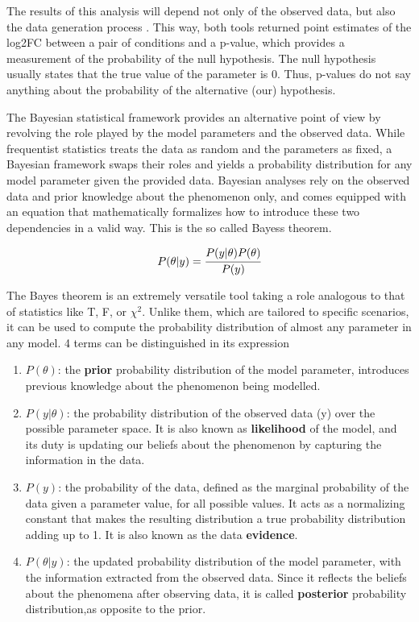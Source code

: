 The results of this analysis will depend not only of the observed data, but also the data generation process \cite{Kruschke}. This way, both tools returned point estimates of the log2FC between a pair of conditions and a p-value, which provides a measurement of the probability of the null hypothesis. The null hypothesis usually states that the true value of the parameter is 0. Thus, p-values do not say anything about the probability of the alternative (our) hypothesis.

The Bayesian statistical framework provides an alternative point of view by revolving the role played by the model parameters and the observed data. While frequentist statistics treats the data as random and the parameters as fixed, a Bayesian framework swaps their roles and yields a probability distribution for any model parameter given the provided data. Bayesian analyses rely on the observed data and prior knowledge about the phenomenon only, and comes equipped with an equation that mathematically formalizes how to introduce these two dependencies in a valid way. This is the so called Bayes\textquotesingle s theorem.

\begin{equation}
P(\theta | y) = \cfrac{P(y | \theta) P(\theta)}{P(y)}
\end{equation}

The Bayes theorem is an extremely versatile tool taking a role analogous to that of statistics like T, F, or $\chi^2$. Unlike them, which are tailored to specific scenarios, it can be used to compute the probability distribution of almost any parameter in any model. 4 terms can be distinguished in its expression

\begin{enumerate}

\item $P(\theta)$: the \textbf{prior} probability distribution of the model parameter, introduces previous knowledge about the phenomenon being modelled.

\item $P(y | \theta)$: the probability distribution of the observed data (y) over the possible parameter space. It is also known as \textbf{likelihood} of the model, and its duty is updating our beliefs about the phenomenon by capturing the information in the data.

\item $P(y)$: the probability of the data, defined as the marginal probability of the data given a parameter value, for all possible values. It acts as a normalizing constant that makes the resulting distribution a true probability distribution adding up to 1. It is also known as the data \textbf{evidence}.

\item $P(\theta | y)$: the updated probability distribution of the model parameter, with the information extracted from the observed data. Since it reflects the beliefs about the phenomena after observing data, it is called \textbf{posterior} probability distribution,as opposite to the prior.

\end{enumerate}



